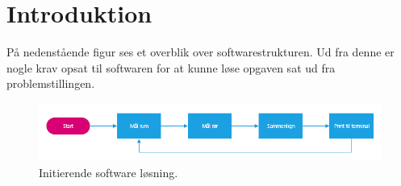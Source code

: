 \section{Introduktion}
På nedenstående figur ses et overblik over softwarestrukturen. Ud fra denne er nogle krav opsat til softwaren for at kunne løse opgaven sat ud fra problemstillingen. 
\begin{figure}[h!]
  \centering
  \includegraphics[width=1\textwidth]{figures/Fase1software.png}
  \caption{Initierende software løsning.}
  \label{initierende_figur}
\end{figure}
